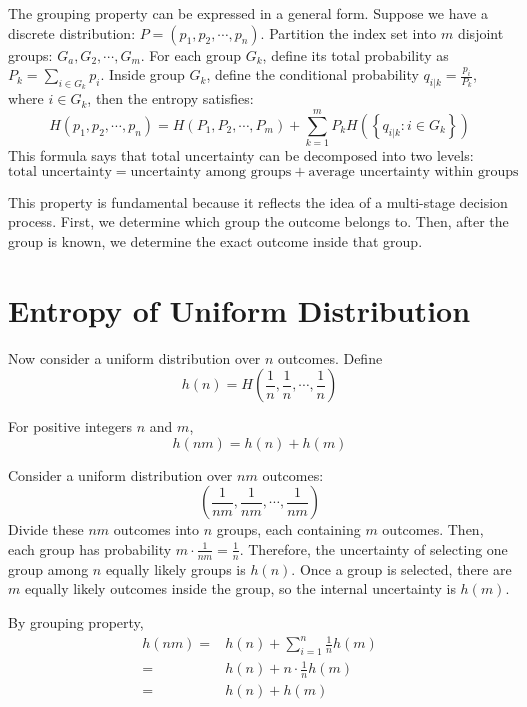 \documentclass[11pt]{report}
\theoremstyle{lecturedefinition}
\theoremstyle{lectureremark}
\begin{document}
The grouping property can be expressed in a general form. Suppose we have a discrete distribution: $P=(p_1, p_2, \cdots,p_n)$. Partition the index set into $m$ disjoint groups: $G_a, G_2,\cdots, G_m$. For each group $G_k$, define its total probability as $P_k=\sum_{i\in G_k}p_i$. Inside group $G_k$, define the conditional probability $q_{i|k}=\frac{p_i}{P_k}$, where $i\in G_k$, then the entropy satisfies:
\begin{equation}
    H(p_1, p_2,\cdots, p_n)=H(P_1, P_2,\cdots, P_m)+\sum_{k=1}^m P_k H\left(\left\{ q_{i|k}:i\in G_k \right\}\right)
\end{equation}
This formula says that total uncertainty can be decomposed into two levels:
\begin{equation*}
    \text{total uncertainty} = \text{uncertainty among groups} + \text{average uncertainty within groups}
\end{equation*}

This property is fundamental because it reflects the idea of a multi-stage decision process. First, we determine which group the outcome belongs to. Then, after the group is known, we determine the exact outcome inside that group.

\section{Entropy of Uniform Distribution}
Now consider a uniform distribution over $n$ outcomes. Define
\begin{equation}
    h(n)=H\left(\frac{1}{n},\frac{1}{n},\cdots, \frac{1}{n}\right)
\end{equation}

\begin{lemma}
For positive integers $n$ and $m$,
\vspace{-0.8em}
\[
h(nm)=h(n) + h(m)
\]
\vspace{-1.2em}
\tcblower

Consider a uniform distribution over $nm$ outcomes:
\[
\left(\frac{1}{nm},\frac{1}{nm},\cdots,\frac{1}{nm}\right)
\]
Divide these $nm$ outcomes into $n$ groups, each containing $m$ outcomes. Then, each group has probability $m\cdot \frac{1}{nm}=\frac{1}{n}$. Therefore, the uncertainty of selecting one group among $n$ equally likely groups is $h(n)$. Once a group is selected, there are $m$ equally likely outcomes inside the group, so the internal uncertainty is $h(m)$.

By grouping property,
\begin{equation*}
\begin{aligned}
h(nm)=&h(n)+\sum_{i=1}^n \frac{1}{n}h(m) \\
=&h(n)+n\cdot \frac{1}{n}h(m)\\
=& h(n)+h(m)
\end{aligned}
\end{equation*}
\end{lemma}
\end{document}
